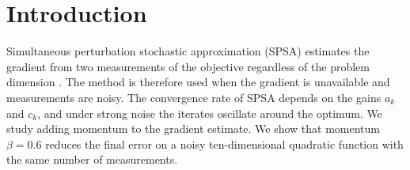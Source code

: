\section{Introduction}\label{sec:intro}
Simultaneous perturbation stochastic approximation (SPSA) estimates the gradient from two measurements
of the objective regardless of the problem dimension \cite{spall1992}.
The method is therefore used when the gradient is unavailable and measurements are noisy.
The convergence rate of SPSA depends on the gains $a_k$ and $c_k$, and under strong noise the iterates
oscillate around the optimum.
We study adding momentum to the gradient estimate.
We show that momentum $\beta = 0.6$ reduces the final error on a noisy ten-dimensional quadratic
function with the same number of measurements.
